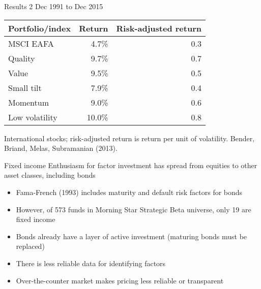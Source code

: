 \documentclass[14pt,xcolor=pdftex,dvipsnames,table]{beamer}\usepackage[]{graphicx}\usepackage[]{color}
\begin{document}
\begin{frame}{Results 2}
Dec 1991 to Dec 2015
\begin{table}
\begin{center}
\begin{tabular}{l r r }
\textbf{Portfolio/index} & \textbf{Return} & \textbf{Risk-adjusted return} \\
\hline
MSCI EAFA        & 4.7\% &  0.3\\
Quality         & 9.7\% & 0.7\\
Value           & 9.5\% & 0.5\\
Small tilt      & 7.9\% & 0.4\\
Momentum        & 9.0\% & 0.6\\
Low volatility &  10.0\% & 0.8\\
\end{tabular}
\end{center}
\end{table}
International stocks; risk-adjusted return is return per unit of volatility. Bender, Briand, Melas, Subramanian (2013).
\end{frame}



\begin{frame}{Fixed income}
Enthusiasm for factor investment has spread from equities to other asset classes, including bonds
\begin{itemize}[<+-| alert@+>]
\pause
\item Fama-French (1993) includes maturity and default risk factors for bonds
\item However, of 573 funds in Morning Star Strategic Beta universe, only 19 are fixed income
\item Bonds already have a layer of active investment (maturing bonds must be replaced)
\item There is less reliable data for identifying factors
\item Over-the-counter market makes pricing less reliable or transparent
\end{itemize}
\end{frame}
\end{document}
